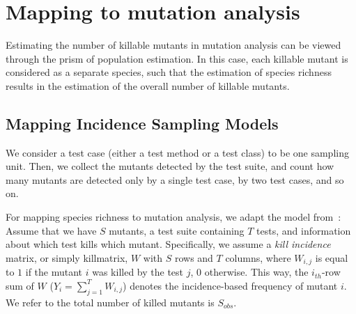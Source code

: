 \documentclass[sigconf,review,anonymous]{acmart}
\begin{document}
\section{Mapping to mutation analysis}
\label{sec:mapping}
Estimating the number of killable mutants in mutation analysis can be
viewed through the prism of population estimation. In this case,
each killable
mutant is considered as a separate species, such that the estimation of species richness
results in the estimation of the overall number of killable mutants.



\subsection{Mapping Incidence Sampling Models}
\label{ssec:mapincidence}

We consider a test case (either a test method or a test class) to be one sampling unit. 
%
Then, we collect the mutants detected by the test suite, and count how many mutants
are detected only by a single test case,%
by two test cases, and so on.

For mapping species richness to mutation analysis, we adapt the model from~\cite{chao2016species}:
%
Assume that we have $S$ mutants, a test suite containing $T$ tests, and
information about which test kills which mutant.
Specifically, we assume a \emph{kill incidence} matrix, or simply killmatrix,
$W$ with $S$ rows and $T$ columns,
where $W_{i,j}$ is equal to $1$ if the mutant $i$ was killed by the test $j$, $0$ otherwise.
%
This way, the $i_{th}$-row sum of $W$ %
($Y_i=\sum_{j=1}^{T}W_{i,j}$) %
denotes the incidence-based frequency of mutant $i$.
We refer to the total number of killed mutants is $S_{obs}$.
%
\end{document}
